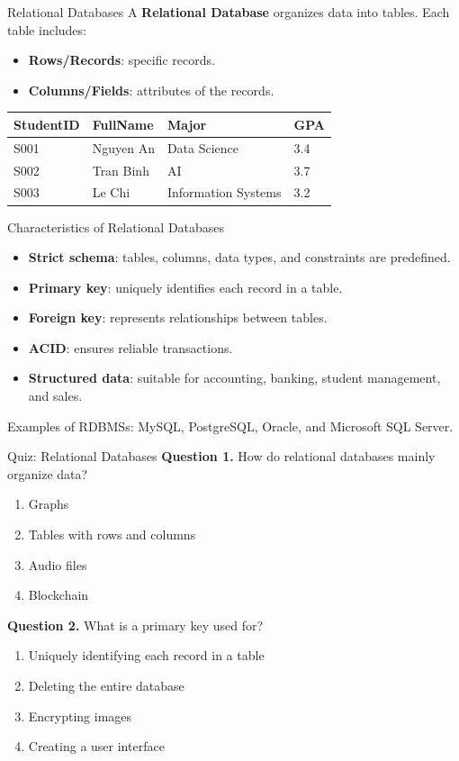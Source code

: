 \documentclass[aspectratio=169,11pt]{beamer}
\newcommand{\keyword}[1]{\textcolor{accent}{\textbf{#1}}}
\newcommand{\tightlist}{\setlength{\itemsep}{2pt}\setlength{\parskip}{0pt}}
\newcommand{\qoption}[2]{\item[#1.] #2}
\begin{document}
\begin{frame}{Relational Databases}
\small
A \keyword{Relational Database} organizes data into tables. Each table includes:
\begin{itemize}
\tightlist
  \item \textbf{Rows/Records}: specific records.
  \item \textbf{Columns/Fields}: attributes of the records.
\end{itemize}

\begin{table}[]
\centering
\scriptsize
\begin{tabular}{llll}
\toprule
StudentID & FullName & Major & GPA \\
\midrule
S001 & Nguyen An & Data Science & 3.4 \\
S002 & Tran Binh & AI & 3.7 \\
S003 & Le Chi & Information Systems & 3.2 \\
\bottomrule
\end{tabular}
\end{table}
\end{frame}

\begin{frame}{Characteristics of Relational Databases}
\small
\begin{itemize}
\tightlist
  \item \textbf{Strict schema}: tables, columns, data types, and constraints are predefined.
  \item \textbf{Primary key}: uniquely identifies each record in a table.
  \item \textbf{Foreign key}: represents relationships between tables.
  \item \textbf{ACID}: ensures reliable transactions.
  \item \textbf{Structured data}: suitable for accounting, banking, student management, and sales.
\end{itemize}

Examples of RDBMSs: MySQL, PostgreSQL, Oracle, and Microsoft SQL Server.
\end{frame}

\begin{frame}{Quiz: Relational Databases}
\small
\textbf{Question 1.} How do relational databases mainly organize data?
\begin{enumerate}
\tightlist
  \qoption{A}{Graphs}
  \qoption{B}{Tables with rows and columns}
  \qoption{C}{Audio files}
  \qoption{D}{Blockchain}
\end{enumerate}

\textbf{Question 2.} What is a primary key used for?
\begin{enumerate}
\tightlist
  \qoption{A}{Uniquely identifying each record in a table}
  \qoption{B}{Deleting the entire database}
  \qoption{C}{Encrypting images}
  \qoption{D}{Creating a user interface}
\end{enumerate}
\end{frame}
\end{document}
